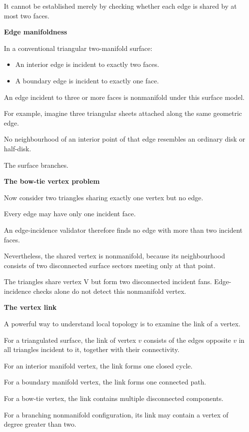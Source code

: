 It cannot be established merely by checking whether each edge is shared by at most two faces.

\textbf{Edge manifoldness}

In a conventional triangular two-manifold surface:

\begin{itemize}
\tightlist
\item
  An interior edge is incident to exactly two faces.
\item
  A boundary edge is incident to exactly one face.
\end{itemize}

An edge incident to three or more faces is nonmanifold under this surface model.

For example, imagine three triangular sheets attached along the same geometric edge.

No neighbourhood of an interior point of that edge resembles an ordinary disk or half-disk.

The surface branches.

\textbf{The bow-tie vertex problem}

Now consider two triangles sharing exactly one vertex but no edge.

Every edge may have only one incident face.

An edge-incidence validator therefore finds no edge with more than two incident faces.

Nevertheless, the shared vertex is nonmanifold, because its neighbourhood consists of two disconnected surface sectors meeting only at that point.

The triangles share vertex V but form two disconnected incident fans. Edge-incidence checks alone do not detect this nonmanifold vertex.

\textbf{The vertex link}

A powerful way to understand local topology is to examine the link of a vertex.

For a triangulated surface, the link of vertex \(v\) consists of the edges opposite \(v\) in all triangles incident to it, together with their connectivity.

For an interior manifold vertex, the link forms one closed cycle.

For a boundary manifold vertex, the link forms one connected path.

For a bow-tie vertex, the link contains multiple disconnected components.

For a branching nonmanifold configuration, its link may contain a vertex of degree greater than two.

